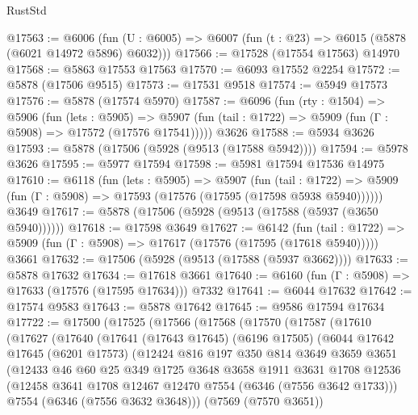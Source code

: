 \begin{lexlean}{RustStd}
\begin{coremodule}
@17563 := @6006
    (fun (U : @6005) => @6007 (fun (t : @23) => @6015 (@5878 (@6021 @14972 @5896) @6032)))
@17566 := @17528 (@17554 @17563) @14970
@17568 := @5863 @17553 @17563
@17570 := @6093 @17552 @2254
@17572 := @5878 (@17506 @9515)
@17573 := @17531 @9518
@17574 := @5949 @17573
@17576 := @5878 (@17574 @5970)
@17587 := @6096
    (fun (rty : @1504) =>
    @5906
      (fun (lets : @5905) =>
      @5907 (fun (tail : @1722) => @5909 (fun (Γ : @5908) => @17572 (@17576 @17541)))))
    @3626
@17588 := @5934 @3626
@17593 := @5878 (@17506 (@5928 (@9513 (@17588 @5942))))
@17594 := @5978 @3626
@17595 := @5977 @17594
@17598 := @5981 @17594 @17536 @14975
@17610 := @6118
    (fun (lets : @5905) =>
    @5907
      (fun (tail : @1722) =>
      @5909 (fun (Γ : @5908) => @17593 (@17576 (@17595 (@17598 @5938 @5940))))))
    @3649
@17617 := @5878 (@17506 (@5928 (@9513 (@17588 (@5937 (@3650 @5940))))))
@17618 := @17598 @3649
@17627 := @6142
    (fun (tail : @1722) => @5909 (fun (Γ : @5908) => @17617 (@17576 (@17595 (@17618 @5940)))))
    @3661
@17632 := @17506 (@5928 (@9513 (@17588 (@5937 @3662))))
@17633 := @5878 @17632
@17634 := @17618 @3661
@17640 := @6160 (fun (Γ : @5908) => @17633 (@17576 (@17595 @17634))) @7332
@17641 := @6044 @17632
@17642 := @17574 @9583
@17643 := @5878 @17642
@17645 := @9586 @17594 @17634
@17722 := @17500
    (@17525
      (@17566
        (@17568
          (@17570
            (@17587
              (@17610
                (@17627
                  (@17640
                    (@17641
                      (@17643 @17645)
                      (@6196 @17505)
                      (@6044
                        @17642
                        @17645
                        (@6201 @17573)
                        (@12424
                          @816
                          @197
                          @350
                          @814
                          @3649
                          @3659
                          @3651
                          (@12433
                            @46
                            @60
                            @25
                            @349
                            @1725
                            @3648
                            @3658
                            @1911
                            @3631
                            @1708
                            @12536
                            (@12458 @3641 @1708 @12467 @12470 @7554 (@6346 (@7556 @3642 @1733)))
                            @7554
                            (@6346 (@7556 @3632 @3648)))
                          (@7569 (@7570 @3651))

\end{coremodule}
\end{lexlean}
